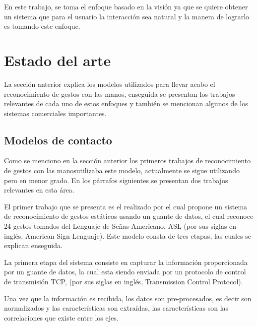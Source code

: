 

En este trabajo, se toma el enfoque basado en la visión ya que se quiere obtener un sistema que para el usuario la interacción sea natural y la manera de lograrlo es tomando este enfoque.  



\section{Estado del arte}\label{sec:EstadoDelArte} 

La sección anterior explica los modelos utilizados para llevar acabo el reconocimiento de gestos con las manos, enseguida se presentan los trabajos relevantes de cada uno de estos enfoques y también se mencionan algunos de los sistemas comerciales importantes. 

\subsection{Modelos de contacto}
 
Como se menciono en la sección anterior los primeros trabajos de reconocimiento de gestos con las manosutilizaba este modelo, actualmente se sigue utilizando pero en menor grado. En los párrafos siguientes se presentan dos trabajos relevantes en esta área. 

El primer trabajo que se presenta es el realizado por \citep{Yoon2012} el cual propone un sistema de reconocimiento de gestos estáticos usando un guante de datos, el cual reconoce $24$ gestos tomados del Lenguaje de Señas Americano, ASL (por sus siglas en inglés, American Sign Lenguaje). Este modelo consta de tres etapas, las cuales se explican enseguida. 

La primera etapa del sistema consiste en capturar la información proporcionada por un guante de datos, la cual esta siendo enviada por un protocolo de control de transmisión TCP, (por sus siglas en inglés, Transmission Control Protocol). 
 
Una vez que la información es recibida, los datos son pre-procesados, es decir son normalizados y las características son extraídas, las características son las correlaciones que existe entre los ejes.    
 
